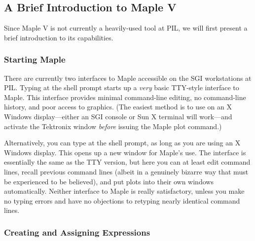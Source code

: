 \subsection{A Brief Introduction to Maple V}

Since Maple V is not currently a heavily-used tool at PIL, we will first
present a brief introduction to its capabilities.

\subsubsection{Starting Maple}

There are currently two interfaces to Maple accessible on the SGI
workstations at PIL.  Typing  at the shell prompt starts up
a {\em very} basic TTY-style interface to Maple.  This interface
provides minimal command-line editing, no command-line history, and poor
access to graphics.  (The easiest method is to use  on an
X Windows display---either an SGI console or Sun X terminal will
work---and activate the Tektronix window {\em before} issuing the Maple
plot command.)

Alternatively, you can type  at the shell prompt, as long
as you are using an X Windows display.  This opens up a new window for
Maple's use.  The interface is essentially the same as the TTY version,
but here you can at least edit command lines, recall previous command
lines (albeit in a genuinely bizarre way that must be experienced to be
believed), and put plots into their own windows automatically.  Neither
interface to Maple is really satisfactory, unless you make no typing
errors and have no objections to retyping nearly identical command
lines.

\subsubsection{Creating and Assigning Expressions}

